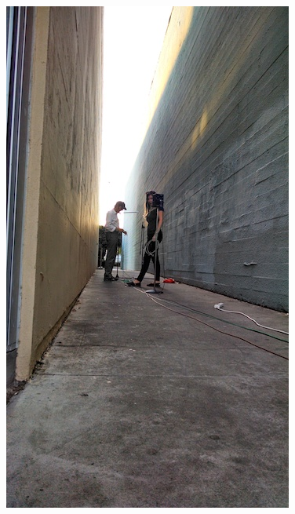 \documentclass{aes137}
\begin{document}
\begin{figure}
\begin{minipage}[b]{0.3\linewidth} \centering
\includegraphics[width=\textwidth, trim=0mm 16mm 0mm 18mm, clip]{images/pic_P14.jpg}
\end{minipage}
\hspace{0.01\linewidth}
\begin{minipage}[b]{0.68\linewidth} \centering

\end{minipage}
\end{figure}
\end{document}
